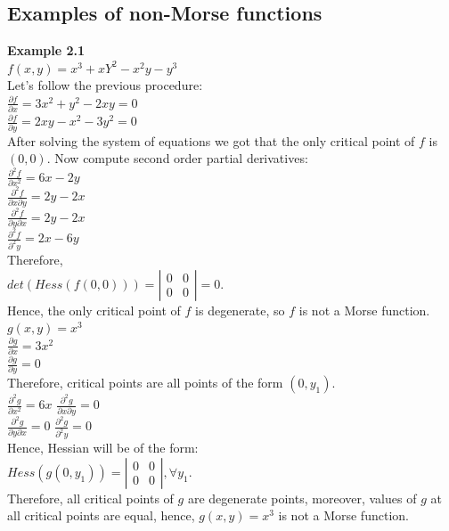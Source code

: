 \documentclass[]{article}
\begin{document}
\subsection{Examples of non-Morse functions} 
\textbf{Example 2.1}\\
$f(x,y)=x^3+xY^2-x^2y-y^3$\\
Let's follow the previous procedure: \\
$\frac{\partial f}{\partial x}=3x^2+y^2-2xy=0$\\
$\frac{\partial f}{\partial y}=2xy-x^2-3y^2=0$\\
After solving the system of equations we got that the only critical point of $f$ is $(0,0)$. Now compute second order partial derivatives:\\
$\frac{\partial^2 f}{\partial x^2}=6x-2y$\\
$\frac{\partial^2 f}{\partial x \partial y}=2y-2x$\\
$\frac{\partial^2 f}{\partial y \partial x}=2y-2x$\\
$\frac{\partial^2 f}{\partial^2 y}=2x-6y$\\
Therefore, \\
$det(Hess(f(0,0)))=\left| \begin{array}{cc} 0 & 0 \\ 0 & 0 \end{array} \right|=0$.\\
Hence, the only critical point of $f$ is degenerate, so $f$ is not a Morse function. \\
$g(x,y)=x^3$\\
$\frac{\partial g}{\partial x}=3x^2$\\
$\frac{\partial g}{\partial y}=0$\\
Therefore, critical points are all points of the form $(0, y_1)$.\\
$\frac{\partial^2 g}{\partial x^2}=6x$
$\frac{\partial^2 g}{\partial x \partial y}=0$\\
$\frac{\partial^2 g}{\partial y \partial x}=0$
$\frac{\partial^2 g}{\partial^2 y}=0$\\
Hence, Hessian will be of the form: \\
$Hess(g(0,y_1))=\left| \begin{array}{cc} 0 & 0 \\ 0 & 0 \end{array} \right|,  \forall y_1$. \\
Therefore, all critical points of $g$ are degenerate points, moreover, values of $g$ at all critical points are equal, hence, $g(x,y)=x^3$ is not a Morse function. 
\end{document}
